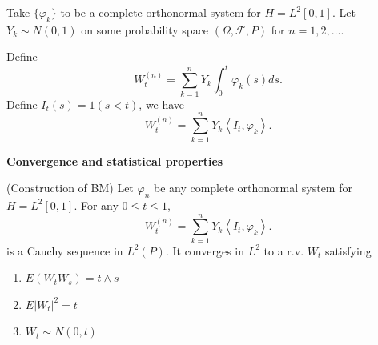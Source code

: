 Take $\{\varphi_k\} $ to be a complete orthonormal system for $H = L^2[0,1]$. Let $Y_k \sim N(0,1)$ on some probability space $(\Omega, \mathcal{F}, P)$ for $n = 1,2,\ldots$.

Define
\[
	W_t^{(n)}
	= \sum_{k=1}^{n} Y_k \int _0^t \varphi_k(s) ds
.\] 
Define $I_t(s) = 1(s < t)$, we have
\begin{equation}
	\label{eqn:BMConstruction}
	W_t^{(n)} = \sum_{k=1}^{n} Y_k \left\langle I_t, \varphi_k \right\rangle 
.\end{equation} 

\textbf{Convergence and statistical properties}
\begin{lemma}(Construction of BM)
	\label{lem:BMConstructConverge}
	Let $\varphi_n$ be any complete orthonormal system for $H = L^2[0,1]$.
	For any $0 \le t \le 1$, 
	\[
	W_t^{(n)} = \sum_{k=1}^{n} Y_k \left\langle I_t, \varphi_k \right\rangle 
.\] 
is a Cauchy sequence in  $L^2(P)$. It converges in $L^2$ to a r.v. $W_t$ satisfying
	\begin{enumerate}
		\item $E\left( W_t W_s \right)  = t \wedge s$
		\item $E\left| W_t \right| ^2 = t$ 
		\item $W_t \sim N(0,t)$
	\end{enumerate}
\end{lemma}
